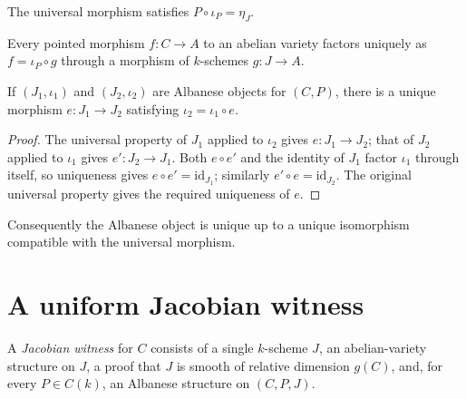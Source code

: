 \begin{lemma}\leanok
  \label{lem:IsAlbanese_comp_ofCurve}
  The universal morphism satisfies \(P \circ \iota_P = \eta_J\).
\end{lemma}

\begin{lemma}\leanok
  \label{lem:IsAlbanese_exists_unique_ofCurve_comp}
  Every pointed morphism \(f \colon C \to A\) to an abelian variety factors
  uniquely as \(f=\iota_P\circ g\) through a morphism of \(k\)-schemes
  \(g \colon J \to A\).
\end{lemma}

\begin{theorem}\leanok
  \label{thm:IsAlbanese_unique}
  If \((J_1,\iota_1)\) and \((J_2,\iota_2)\) are Albanese objects for
  \((C,P)\), there is a unique morphism \(e \colon J_1\to J_2\) satisfying
  \(\iota_2=\iota_1\circ e\).
\end{theorem}

\begin{proof}\leanok
  The universal property of \(J_1\) applied to \(\iota_2\) gives
  \(e \colon J_1\to J_2\); that of \(J_2\) applied to \(\iota_1\) gives
  \(e' \colon J_2\to J_1\).  Both \(e\circ e'\) and the identity of \(J_1\)
  factor \(\iota_1\) through itself, so uniqueness gives
  \(e\circ e'=\mathrm{id}_{J_1}\); similarly
  \(e'\circ e=\mathrm{id}_{J_2}\).  The original universal property gives the
  required uniqueness of \(e\).
\end{proof}

\begin{remark}
  \label{rem:IsAlbanese_unique_iso}
  Consequently the Albanese object is unique up to a unique isomorphism
  compatible with the universal morphism.
\end{remark}

\section{A uniform Jacobian witness}

\begin{definition}\leanok
  \label{def:JacobianWitness}
  A \emph{Jacobian witness} for \(C\) consists of a single \(k\)-scheme \(J\),
  an abelian-variety structure on \(J\), a proof that \(J\) is smooth of
  relative dimension \(g(C)\), and, for every \(P\in C(k)\), an Albanese
  structure on \((C,P,J)\).
\end{definition}

